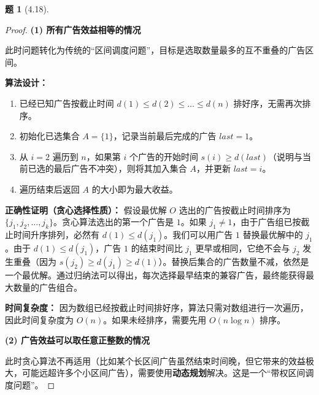 \documentclass[11pt, a4paper]{article}
\newtheorem{problem}{题}
\begin{document}
\begin{problem}[4.18]
\end{problem}

\begin{proof}
    \textbf{(1) 所有广告效益相等的情况}
    
    此时问题转化为传统的“区间调度问题”，目标是选取数量最多的互不重叠的广告区间。
    
    \textbf{算法设计：}
    \begin{enumerate}
        \item 已经已知广告按截止时间 $d(1) \le d(2) \le \dots \le d(n)$ 排好序，无需再次排序。
        \item 初始化已选集合 $A = \{1\}$，记录当前最后完成的广告 $last = 1$。
        \item 从 $i = 2$ 遍历到 $n$，如果第 $i$ 个广告的开始时间 $s(i) \ge d(last)$（说明与当前已选的最后广告不冲突），则将其加入集合 $A$，并更新 $last = i$。
        \item 遍历结束后返回 $A$ 的大小即为最大收益。
    \end{enumerate}
    
    \textbf{正确性证明（贪心选择性质）：}
    假设最优解 $O$ 选出的广告按截止时间排序为 $\{j_1, j_2, \dots, j_k\}$。贪心算法选出的第一个广告是 $1$。如果 $j_1 \neq 1$，由于广告组已按截止时间升序排列，必然有 $d(1) \le d(j_1)$。我们可以用广告 $1$ 替换最优解中的 $j_1$。由于 $d(1) \le d(j_1)$，广告 $1$ 的结束时间比 $j_1$ 更早或相同，它绝不会与 $j_2$ 发生重叠（因为 $s(j_2) \ge d(j_1) \ge d(1)$）。替换后集合的广告数量不减，依然是一个最优解。通过归纳法可以得出，每次选择最早结束的兼容广告，最终能获得最大数量的广告组合。

    \textbf{时间复杂度：}
    因为数组已经按截止时间排好序，算法只需对数组进行一次遍历，因此时间复杂度为 $O(n)$。如果未经排序，需要先用 $O(n \log n)$ 排序。

    \vspace{1em}
    \textbf{(2) 广告效益可以取任意正整数的情况}
    
    此时贪心算法不再适用（比如某个长区间广告虽然结束时间晚，但它带来的效益极大，可能远超许多个小区间广告），需要使用\textbf{动态规划}解决。这是一个“带权区间调度问题”。
    

\end{proof}
\end{document}
